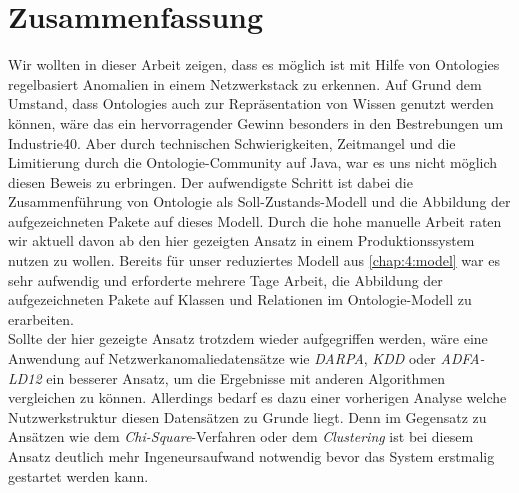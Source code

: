 \chapter{Zusammenfassung}
Wir wollten in dieser Arbeit zeigen, dass es möglich ist mit Hilfe von \Glspl{Ontologie} regelbasiert Anomalien in einem Netzwerkstack zu erkennen. Auf Grund dem Umstand, dass \Glspl{Ontologie} auch zur Repräsentation von Wissen genutzt werden können, wäre das ein hervorragender Gewinn besonders in den Bestrebungen um \Gls{Industrie40}. Aber durch technischen Schwierigkeiten, Zeitmangel und die Limitierung durch die Ontologie-Community auf Java, war es uns nicht möglich diesen Beweis zu erbringen. Der aufwendigste Schritt ist dabei die Zusammenführung von \Gls{Ontologie} als Soll-Zustands-Modell und die Abbildung der aufgezeichneten Pakete auf dieses Modell. Durch die hohe manuelle Arbeit raten wir aktuell davon ab den hier gezeigten Ansatz in einem Produktionssystem nutzen zu wollen. Bereits für unser reduziertes Modell aus \autoref{chap:4:model} war es sehr aufwendig und erforderte mehrere Tage Arbeit, die Abbildung der aufgezeichneten Pakete auf Klassen und Relationen im \Gls{Ontologie}-Modell zu erarbeiten.\\
Sollte der hier gezeigte Ansatz trotzdem wieder aufgegriffen werden, wäre eine Anwendung auf Netzwerkanomaliedatensätze wie \textit{DARPA}\cite{darpa99}, \textit{KDD}\cite{kdd99} oder \textit{ADFA-LD12}\cite{adfald} ein besserer Ansatz, um die Ergebnisse mit anderen Algorithmen vergleichen zu können. Allerdings bedarf es dazu einer vorherigen Analyse welche Nutzwerkstruktur diesen Datensätzen zu Grunde liegt. Denn im Gegensatz zu Ansätzen wie dem \textit{Chi-Square}-Verfahren\cite{ye2001anomaly} oder dem \textit{Clustering}\cite{likas2003global} ist bei diesem Ansatz deutlich mehr Ingeneursaufwand notwendig bevor das System erstmalig gestartet werden kann.